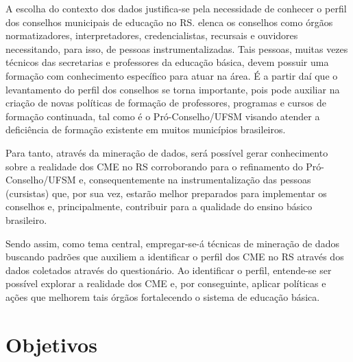 \documentclass[tg]{mdtufsm}
\begin{document}
A escolha do contexto dos dados justifica-se pela necessidade de conhecer o perfil dos conselhos municipais de educação no RS. \cite{bordignon2009} elenca os conselhos como órgãos normatizadores, interpretadores, credencialistas, recursais e ouvidores necessitando, para isso, de pessoas instrumentalizadas. Tais pessoas, muitas vezes técnicos das secretarias e professores da educação básica, devem possuir uma formação com conhecimento específico para atuar na área. É a partir daí que o levantamento do perfil dos conselhos se torna importante, pois pode auxiliar na criação de novas políticas de formação de professores, programas e cursos de formação continuada, tal como é o Pró-Conselho/UFSM visando atender a deficiência de formação existente em muitos municípios brasileiros.  

Para tanto, através da mineração de dados, será possível gerar conhecimento sobre a realidade dos CME no RS corroborando para o refinamento do Pró-Conselho/UFSM e, consequentemente na instrumentalização das pessoas (cursistas) que, por sua vez, estarão melhor preparados para implementar os conselhos e, principalmente, contribuir para a qualidade do ensino básico brasileiro.

Sendo assim, como tema central, empregar-se-á técnicas de mineração de dados buscando padrões que auxiliem a identificar o perfil dos CME no RS através dos dados coletados através do questionário. Ao identificar o perfil, entende-se ser possível explorar a realidade dos CME e, por conseguinte, aplicar políticas e ações que melhorem tais órgãos fortalecendo o sistema de educação básica.



\section{Objetivos}
\end{document}
